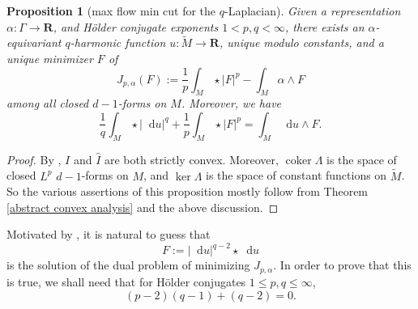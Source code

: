 \documentclass[reqno,11pt]{amsart}
\newcommand{\RR}{\mathbf{R}}
\newcommand*\dif{\mathop{}\!\mathrm{d}}
\DeclareMathOperator{\coker}{coker}
\newtheorem{proposition}[theorem]{Proposition}
\theoremstyle{definition}
\numberwithin{equation}{section}
\begin{document}
\begin{proposition}[max flow min cut for the $q$-Laplacian]
Given a representation $\alpha: \Gamma \to \RR$, and H\"older conjugate exponents $1 < p, q < \infty$, there exists an $\alpha$-equivariant $q$-harmonic function $u: \tilde M \to \RR$, unique modulo constants, and a unique minimizer $F$ of 
$$J_{p, \alpha}(F) := \frac{1}{p} \int_M \star |F|^p - \int_M \alpha \wedge F$$
among all closed $d - 1$-forms on $M$.
Moreover, we have
\begin{equation}\label{strong duality}
	\frac{1}{q} \int_M \star |\dif u|^q + \frac{1}{p} \int_M \star |F|^p = \int_M \dif u \wedge F.
\end{equation}
\end{proposition}
\begin{proof}
By \cite[Lemma 1]{Loisel_2020}, $I$ and $\hat I$ are both strictly convex.
Moreover, $\coker \Lambda$ is the space of closed $L^p$ $d - 1$-forms on $M$, and $\ker \Lambda$ is the space of constant functions on $\tilde M$.
So the various assertions of this proposition mostly follow from Theorem \ref{abstract convex analysis} and the above discussion.
\end{proof}

Motivated by \cite[\S3.1]{daskalopoulos2020transverse}, it is natural to guess that 
\begin{equation}\label{dual solution}
F := |\dif u|^{q - 2} \star \dif u
\end{equation}
is the solution of the dual problem of minimizing $J_{p, \alpha}$.
In order to prove that this is true, we shall need that for H\"older conjugates $1 \leq p, q \leq \infty$,
\begin{equation}\label{holder cancellation}
	(p - 2)(q - 1) + (q - 2) = 0.
\end{equation}
\end{document}
